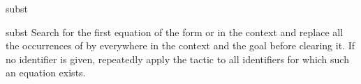 \begin{tactic}{subst}
  \begin{tsyntax}[empty]{subst}
  Search for the first equation of the form  or  in the context
  and replace all the occurrences of  by  everywhere in the context and the
  goal before clearing it. If no identifier is given, repeatedly apply the tactic to
  all identifiers for which such an equation exists.
  \end{tsyntax}
\end{tactic}
